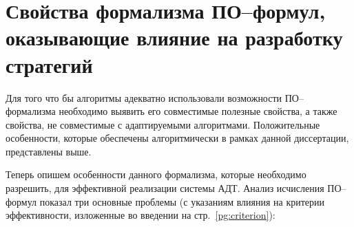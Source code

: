 \section{Свойства формализма ПО--формул, оказывающие влияние на разработку стратегий}
Для того что бы алгоритмы адекватно использовали возможности ПО--формализма необходимо выявить его совместимые полезные свойства, а также свойства, не совместимые с адаптируемыми алгоритмами.  Положительные особенности, которые обеспечены алгоритмически в рамках данной диссертации, представлены выше.

Теперь опишем особенности данного формализма, которые необходимо разрешить, для эффективной реализации системы АДТ.
Анализ исчисления ПО--формул показал три основные проблемы (с указаниям влияния на критерии эффективности, изложенные во введении на стр.~\ref{pg:criterion}):
